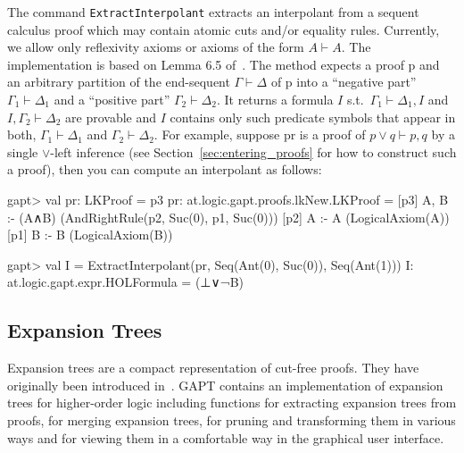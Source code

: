 \documentclass[a4paper,11pt]{article}
\newcommand{\seq}{\vdash}	%
\renewcommand{\lor}{\vee}
\begin{document}
The command \texttt{ExtractInterpolant} extracts an interpolant from a sequent calculus proof which may contain atomic cuts and/or equality rules. Currently, we allow only reflexivity axioms or axioms of the form $A \seq A$. The implementation is based on Lemma 6.5 of~\cite{Takeuti87Proof}. The method expects
a proof p and an arbitrary partition of the end-sequent $\Gamma \seq \Delta$ of p into a 
``negative part'' $\Gamma_1\seq\Delta_1$ and a ``positive part'' $\Gamma_2 \seq \Delta_2$.
It returns a formula $I$ s.t.\ $\Gamma_1\seq\Delta_1, I$ and $I,\Gamma_2\seq\Delta_2$
are provable and $I$ contains only such predicate symbols that appear in both, $\Gamma_1\seq\Delta_1$
and $\Gamma_2\seq\Delta_2$. For example, suppose pr is a proof of $p \lor q \seq p, q$
by a single $\lor$-left inference (see Section~\ref{sec:entering_proofs} for how to construct
such a proof), then you can compute an interpolant as follows:
\begin{clilisting}
gapt> val pr: LKProof = p3
pr: at.logic.gapt.proofs.lkNew.LKProof =
[p3] A, B :- (A∧B)    (AndRightRule(p2, Suc(0), p1, Suc(0)))
[p2] A :- A    (LogicalAxiom(A))
[p1] B :- B    (LogicalAxiom(B))

gapt> val I = ExtractInterpolant(pr, Seq(Ant(0), Suc(0)), Seq(Ant(1)))
I: at.logic.gapt.expr.HOLFormula = (⊥∨¬B)

\end{clilisting}

\subsection{Expansion Trees}

Expansion trees are a compact representation of cut-free proofs. They have originally been
introduced in~\cite{Miller87Compact}. GAPT contains an implementation of
expansion trees for higher-order logic including functions for extracting expansion
trees from proofs, for merging expansion trees, for pruning and transforming them
in various ways and for viewing them in a comfortable way in the graphical user interface.
\end{document}
